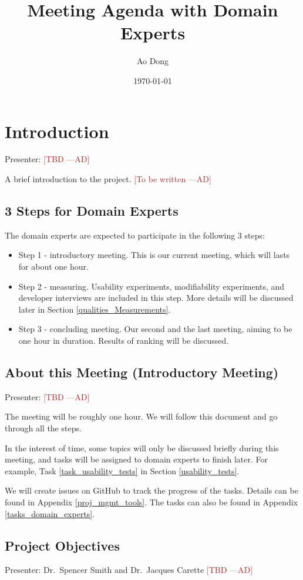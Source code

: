 \documentclass[12pt]{article}
\title{Meeting Agenda with Domain Experts}
\author{Ao Dong}
\date{\today}
\newcommand{\authornote}[3]{\textcolor{#1}{[#3 ---#2]}}
\newcommand{\authornote}[3]{}
\newcommand{\ad}[1]{\authornote{brown}{AD}{#1}} %
\begin{document}
\maketitle

\section{Introduction}
Presenter: \ad{TBD}

A brief introduction to the project. \ad{To be written}

\subsection{3 Steps for Domain Experts}
The domain experts are expected to participate in the following 3 steps:
\begin{itemize}
\item Step 1 - introductory meeting. This is our current meeting, which will
lasts for about one hour.
\item Step 2 - measuring. Usability experiments, modifiability experiments, and
developer interviews are included in this step. More details will be discussed
later in Section \ref{qualities_Measurements}.
\item Step 3 - concluding meeting. Our second and the last meeting, aiming to be
one hour in duration. Results of ranking will be discussed.
\end{itemize}

\subsection{About this Meeting (Introductory Meeting)}
Presenter: \ad{TBD}

The meeting will be roughly one hour. We will follow this document and go
through all the steps.

In the interest of time, some topics will only be discussed briefly during this
meeting, and tasks will be assigned to domain experts to finish later. For
example, Task \ref{task_usability_tests} in Section \ref{usability_tests}.

We will create issues on GitHub to track the progress of the tasks. Details can
be found in Appendix \ref{proj_mgmt_tools}. The tasks can also be found in
Appendix \ref{tasks_domain_experts}.

\subsection{Project Objectives}
\label{project_objectives}
Presenter: Dr.\ Spencer Smith and Dr.\ Jacques Carette \ad{TBD}
\end{document}
